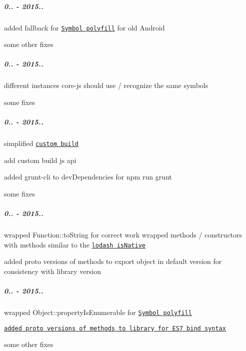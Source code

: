 \subparagraph*{0.. -\/ 2015..}


\begin{DoxyItemize}
\item added fallback for \href{https://github.com/zloirock/core-js/#ecmascript-6-symbol}{\tt {\ttfamily Symbol} polyfill} for old Android
\item some other fixes
\end{DoxyItemize}

\subparagraph*{0.. -\/ 2015..}


\begin{DoxyItemize}
\item different instances {\ttfamily core-\/js} should use / recognize the same symbols
\item some fixes
\end{DoxyItemize}

\subparagraph*{0.. -\/ 2015..}


\begin{DoxyItemize}
\item simplified \href{https://github.com/zloirock/core-js/#custom-build}{\tt custom build}
\begin{DoxyItemize}
\item add custom build js api
\item added {\ttfamily grunt-\/cli} to {\ttfamily dev\+Dependencies} for {\ttfamily npm run grunt}
\end{DoxyItemize}
\item some fixes
\end{DoxyItemize}

\subparagraph*{0.. -\/ 2015..}


\begin{DoxyItemize}
\item wrapped {\ttfamily Function\+::to\+String} for correct work wrapped methods / constructors with methods similar to the \href{https://github.com/lodash/lodash/issues/1197}{\tt {\ttfamily lodash} {\ttfamily is\+Native}}
\item added proto versions of methods to export object in {\ttfamily default} version for consistency with {\ttfamily library} version
\end{DoxyItemize}

\subparagraph*{0.. -\/ 2015..}


\begin{DoxyItemize}
\item wrapped {\ttfamily Object\+::property\+Is\+Enumerable} for \href{https://github.com/zloirock/core-js/#ecmascript-6-symbol}{\tt {\ttfamily Symbol} polyfill}
\item \href{https://github.com/zloirock/core-js/issues/65}{\tt added proto versions of methods to {\ttfamily library} for E\+S7 bind syntax}
\item some other fixes
\end{DoxyItemize}

